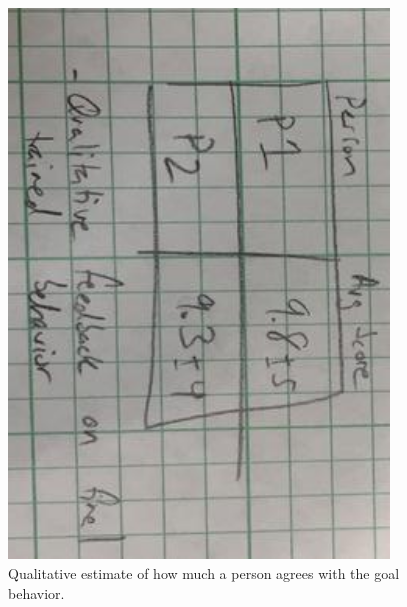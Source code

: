 \begin{figure}[h]
    \centering
    \includegraphics[width=0.9\textwidth]{Images/ToyHumanCostComparison.jpg}
    \caption{Qualitative estimate of how much a person agrees with the goal behavior.}
    \label{fig:ToyHumanCostComparison}
\end{figure}


